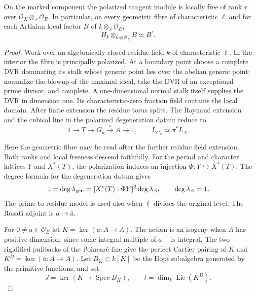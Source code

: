 \begin{auxlemma}
\label{lem:polarized-stalk-free}
On the marked component the polarized tangent module is locally
free of rank \(r\) over \(\mathcal O_X\otimes_{\mathbb Z}\mathcal O_E\).
In particular, on every geometric fibre of characteristic \(\ell\)
and for each Artinian local factor \(B\) of
\(k\otimes_{\mathbb Z}\mathcal O_E\),
\[
                   H_k\otimes_{k\otimes\mathcal O_E}B\simeq B^r .
\]
\end{auxlemma}
\begin{proof}
Work over an algebraically closed residue field \(k\) of
characteristic \(\ell\). In the interior the fibre is principally
polarized. At a boundary point choose a complete DVR dominating its stalk
whose generic point lies over the abelian generic point: normalize
the blowup of the maximal ideal, take the DVR of an exceptional
prime divisor, and complete. A one-dimensional normal stalk
itself supplies the DVR in dimension one. Its characteristic-zero
fraction field contains the local domain. After finite extension
the residue torus splits. The Raynaud extension and the cubical
line in the polarized degeneration datum reduce to
\[
  1\longrightarrow T\longrightarrow G_k
   \xrightarrow{\pi} A\longrightarrow1,\qquad
  L_{G_k}\simeq\pi^*L_A .
\]

Here the geometric fibre may be read after the further residue
field extension. Both ranks and local freeness descend faithfully.
For the period and character lattices \(Y\) and \(X^*(T)\), the
polarization induces an injection \(\Phi:Y\hookrightarrow X^*(T)\).
The degree formula for the degeneration datum gives
\[
   1=\deg\lambda_{\rm gen}
      =[X^*(T):\Phi Y]^2\deg\lambda_A,
      \qquad \deg\lambda_A=1 .
\]
The prime-to-residue model is used also when \(\ell\) divides the
original level. The Rosati adjoint is \(a\mapsto\bar a\).
\cite[Chapter~II, \S\S1--4, and Chapter~III, Corollary~7.2]{faltings-chai}

For \(0\ne a\in\mathcal O_E\) let \(K=\ker(a:A\to A)\).
The action is an isogeny when \(A\) has positive dimension, since
some integral multiple of \(a^{-1}\) is integral. The two
rigidified pullbacks of the Poincar\'e line give the perfect
Cartier pairing of \(K\) and
\(K^D=\ker(\bar a:A\to A)\).
\cite[Theorem~9.1]{milne-av-isogeny}
Let \(B_K\subset k[K]\) be the Hopf subalgebra generated by
the primitive functions, and set
\[
     J=\ker(K\longrightarrow\operatorname{Spec}B_K),\qquad
     t=\dim_k\operatorname{Lie}(K^D).
\]


\end{proof}
